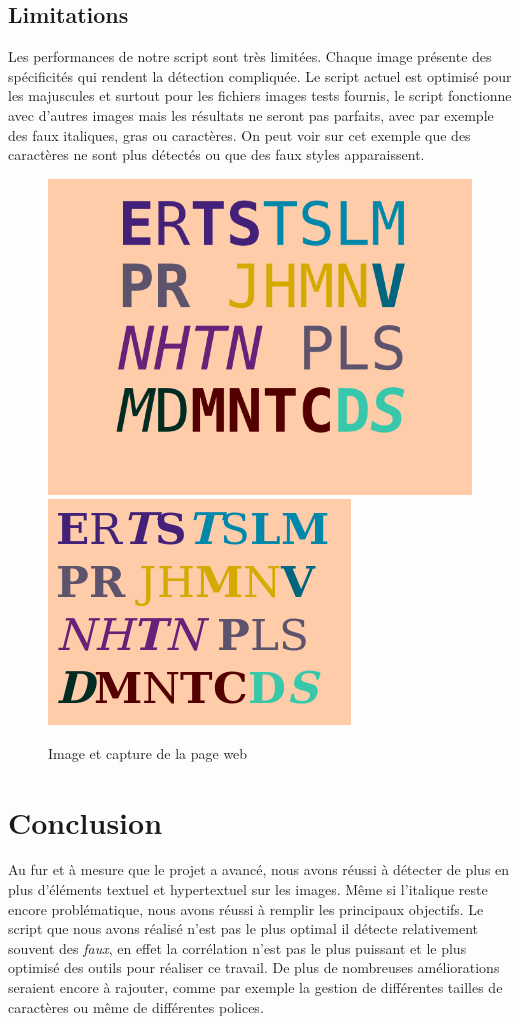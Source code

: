 \documentclass[a4paper,12pt,titlepage]{report}
\begin{document}
	\subsection{Limitations}
	Les performances de notre script sont très limitées. Chaque image présente des spécificités qui rendent la détection compliquée. Le script actuel est optimisé pour les majuscules et surtout pour les fichiers images tests fournis, le script fonctionne avec d'autres images mais les résultats ne seront pas parfaits, avec par exemple des faux italiques, gras ou caractères. 
	On peut voir sur cet exemple que des caractères ne sont plus détectés ou que des faux styles apparaissent.
	\begin{figure}[!h]
	\centering
		\includegraphics[height=0.25\textwidth]{../illus/CRASH.png}
		\includegraphics[height=0.25\textwidth]{../illus/fail.png}
		\caption{Image et capture de la page web}
	\end{figure}
	\section{Conclusion}
	Au fur et à mesure que le projet a avancé, nous avons réussi à détecter de plus en plus d'éléments textuel et hypertextuel sur les images. Même si l'italique reste encore problématique, nous avons réussi à remplir les principaux objectifs.
	Le script que nous avons réalisé n'est pas le plus optimal il détecte relativement souvent des \textit{faux}, en effet la corrélation n'est pas le plus puissant et le plus optimisé des outils pour réaliser ce travail.
	De plus de nombreuses améliorations seraient encore à rajouter, comme par exemple la gestion de différentes tailles de caractères ou même de différentes polices.
	\listoffigures
	
	\lstlistoflistings
\end{document}
